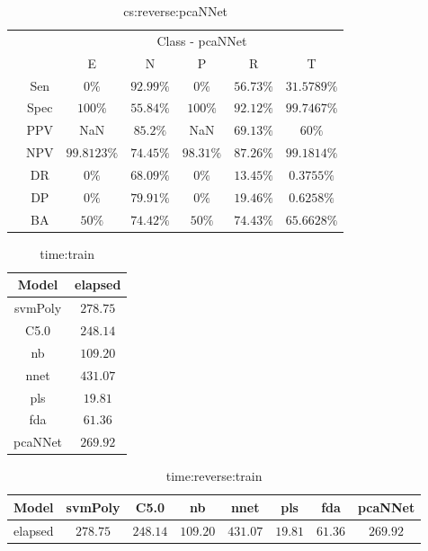 \begin{table}[!ht]
	\centering
	\begin{tabular}{|c|c|c|c|c|c|c|}
		\cline{3-7}
		\multicolumn{2}{c|}{} & \multicolumn{5}{c|}{Class - pcaNNet} \\ \cline{3-7}
		\multicolumn{2}{c|}{} & E & N & P & R & T \\ \hline
		\multirow{7}{*}{\rotatebox{90}{Statistics}} & Sen & $0\%$ & $92.99\%$ & $0\%$ & $56.73\%$ & $31.5789\%$ \\ \cline{2-7}
		 & Spec & $100\%$ & $55.84\%$ & $100\%$ & $92.12\%$ & $99.7467\%$ \\ \cline{2-7}
		 & PPV & NaN & $85.2\%$ & NaN & $69.13\%$ & $60\%$ \\ \cline{2-7}
		 & NPV & $99.8123\%$ & $74.45\%$ & $98.31\%$ & $87.26\%$ & $99.1814\%$ \\ \cline{2-7}
		 & DR & $0\%$ & $68.09\%$ & $0\%$ & $13.45\%$ & $0.3755\%$ \\ \cline{2-7}
		 & DP & $0\%$ & $79.91\%$ & $0\%$ & $19.46\%$ & $0.6258\%$ \\ \cline{2-7}
		 & BA & $50\%$ & $74.42\%$ & $50\%$ & $74.43\%$ & $65.6628\%$ \\ \hline
	\end{tabular}
	\caption{cs:reverse:pcaNNet}
	\label{tab:cs:reverse:pcaNNet}
\end{table}

\begin{table}[!ht]
	\centering
	\begin{tabular}{|c|c|}
		\hline
		Model & elapsed \\ \hline
		svmPoly & $278.75$ \\ \hline
		C5.0 & $248.14$ \\ \hline
		nb & $109.20$ \\ \hline
		nnet & $431.07$ \\ \hline
		pls & $19.81$ \\ \hline
		fda & $61.36$ \\ \hline
		pcaNNet & $269.92$ \\ \hline
	\end{tabular}
	\caption{time:train}
	\label{tab:time:train}
\end{table}

\begin{table}[!ht]
	\centering
	\begin{tabular}{|c|c|c|c|c|c|c|c|}
		\hline
		Model & svmPoly & C5.0 & nb & nnet & pls & fda & pcaNNet \\ \hline
		elapsed & $278.75$ & $248.14$ & $109.20$ & $431.07$ & $19.81$ & $61.36$ & $269.92$ \\ \hline
	\end{tabular}
	\caption{time:reverse:train}
	\label{tab:time:reverse:train}
\end{table}

